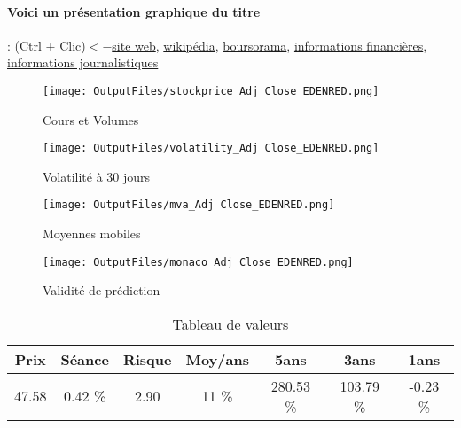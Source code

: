 \documentclass[11pt,a4paper]{report}%
\begin{document}
\paragraph{Voici un présentation graphique du titre} : (Ctrl + Clic)$<-$\href{https://www.edenred.com/fr/investisseurs-et-actionnaires}{site web}, \href{https://fr.wikipedia.org/wiki/Edenred}{wikipédia}, \href{https://www.boursorama.com/cours/1rPEDEN}{boursorama}, \href{https://www.qwant.com/?q=site:https:%2f%2fwww.easybourse.com%2faction-societe%2fEDENRED&t=web&client=ext-firefox-hp}{informations financières}, \href{https://bourse.lerevenu.com/cours-de-bourse/fiche-valeur-synthese/EDENRED/EDEN-FR}{informations journalistiques}
\begin{figure}[!htb]
   \begin{minipage}{0.5\textwidth}
     \centering
     \texttt{[image: OutputFiles/stockprice\_Adj Close\_EDENRED.png]}
     \caption{Cours et Volumes}\label{Fig:price_EDENRED}
   \end{minipage}\hfill
   \begin{minipage}{0.5\textwidth}
     \centering
     \texttt{[image: OutputFiles/volatility\_Adj Close\_EDENRED.png]}
     \caption{Volatilité à 30 jours}\label{Fig:volat_EDENRED}
   \end{minipage}
\end{figure}
\begin{figure}[!htb]
   \begin{minipage}{0.5\textwidth}
     \centering
     \texttt{[image: OutputFiles/mva\_Adj Close\_EDENRED.png]}
     \caption{Moyennes mobiles}\label{Fig:mva_EDENRED}
   \end{minipage}\hfill
   \begin{minipage}{0.5\textwidth}
     \centering
     \texttt{[image: OutputFiles/monaco\_Adj Close\_EDENRED.png]}
     \caption{Validité de prédiction}\label{Fig:prediction_EDENRED}
   \end{minipage}
\end{figure}

\begin{table}[H]
  \centering
    \begin{tabular}{|c|c|c|c|c|c|c|}
    \hline
    Prix & Séance & Risque  & Moy/ans & 5ans & 3ans & 1ans \\
    \hline
    47.58 &    0.42 \%    & 2.90 & 11 \% & 280.53 \% & 103.79 \% & -0.23 \% \\
    \hline
    \end{tabular}%
        \label{tab:table_EDENRED}%
      \caption{Tableau de valeurs}
\end{table}%
\end{document}
